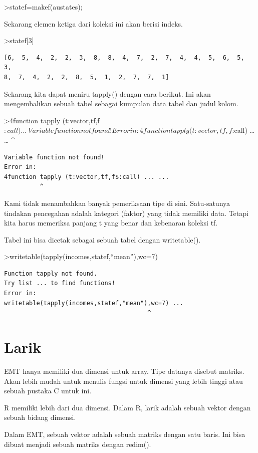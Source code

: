 \documentclass[
]{book}
\begin{document}
\textgreater statef=makef(austates);

Sekarang elemen ketiga dari koleksi ini akan berisi indeks.

\textgreater statef{[}3{]}

\begin{verbatim}
[6,  5,  4,  2,  2,  3,  8,  8,  4,  7,  2,  7,  4,  4,  5,  6,  5,  3,
8,  7,  4,  2,  2,  8,  5,  1,  2,  7,  7,  1]
\end{verbatim}

Sekarang kita dapat meniru tapply() dengan cara berikut. Ini akan mengembalikan sebuah tabel sebagai kumpulan data tabel dan judul kolom.

\textgreater4function tapply (t:vector,tf,f\(:call) ...
\>
    Variable function not found!
    Error in:
    4function tapply (t:vector,tf,f\):call) \ldots{} \ldots{} \^{}

\begin{verbatim}
Variable function not found!
Error in:
4function tapply (t:vector,tf,f$:call) ... ...
          ^
\end{verbatim}

Kami tidak menambahkan banyak pemeriksaan tipe di sini. Satu-satunya tindakan pencegahan adalah kategori (faktor) yang tidak memiliki data. Tetapi kita harus memeriksa panjang t yang benar dan kebenaran koleksi tf.

Tabel ini bisa dicetak sebagai sebuah tabel dengan writetable().

\textgreater writetable(tapply(incomes,statef,``mean''),wc=7)

\begin{verbatim}
Function tapply not found.
Try list ... to find functions!
Error in:
writetable(tapply(incomes,statef,"mean"),wc=7) ...
                                        ^
\end{verbatim}

\section{Larik}\label{larik}

EMT hanya memiliki dua dimensi untuk array. Tipe datanya disebut matriks. Akan lebih mudah untuk menulis fungsi untuk dimensi yang lebih tinggi atau sebuah pustaka C untuk ini.

R memiliki lebih dari dua dimensi. Dalam R, larik adalah sebuah vektor dengan sebuah bidang dimensi.

Dalam EMT, sebuah vektor adalah sebuah matriks dengan satu baris. Ini bisa dibuat menjadi sebuah matriks dengan redim().
\end{document}
